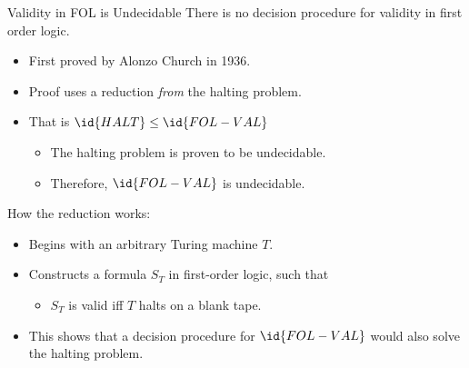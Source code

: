\begin{slide}[bm=,toc=]{Validity in FOL is Undecidable}
There is no decision procedure for validity in first order logic.
\begin{itemize}
\item<2-> First proved by Alonzo Church in 1936.
\item<3-> Proof uses a reduction \emph{from} the halting problem.
\item<4-> That is $\id{HALT} \leq \id{FOL-VAL}$
\begin{itemize}
\item<5-> The halting problem is proven to be undecidable.
\item<6-> Therefore, $\id{FOL-VAL}$ is undecidable.
\end{itemize}
\end{itemize}
\pause[6]
How the reduction works:
\begin{itemize}
\item<8-> Begins with an arbitrary Turing machine $T$.
\item<9-> Constructs a formula $S_T$ in first-order logic, such that
\begin{itemize}
\item<10-> $S_T$ is valid iff $T$ halts on a blank tape.
\end{itemize}
\item<11->This shows that a decision procedure for $\id{FOL-VAL}$ would also solve
the halting problem.
\end{itemize}
\end{slide}

